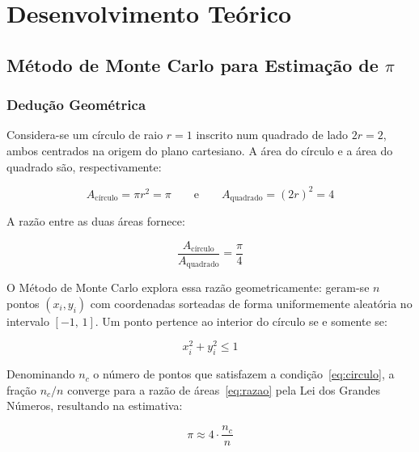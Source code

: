\documentclass[12pt, a4paper]{article}
\begin{document}
	\section{Desenvolvimento Teórico}
	
	\subsection{Método de Monte Carlo para Estimação de $\pi$}
	
	\subsubsection{Dedução Geométrica}
	
	Considera-se um círculo de raio $r = 1$ inscrito num quadrado de lado $2r = 2$,
	ambos centrados na origem do plano cartesiano. A área do círculo e a área do
	quadrado são, respectivamente:
	
	\begin{equation}
		A_{\text{círculo}} = \pi r^2 = \pi
		\qquad \text{e} \qquad
		A_{\text{quadrado}} = (2r)^2 = 4
		\label{eq:areas}
	\end{equation}
	
	A razão entre as duas áreas fornece:
	
	\begin{equation}
		\frac{A_{\text{círculo}}}{A_{\text{quadrado}}} = \frac{\pi}{4}
		\label{eq:razao}
	\end{equation}
	
	O Método de Monte Carlo explora essa razão geometricamente: geram-se $n$ pontos
	$(x_i, y_i)$ com coordenadas sorteadas de forma uniformemente aleatória no
	intervalo $[-1,\,1]$. Um ponto pertence ao interior do círculo se e somente se:
	
	\begin{equation}
		x_i^2 + y_i^2 \leq 1
		\label{eq:circulo}
	\end{equation}
	
	Denominando $n_c$ o número de pontos que satisfazem a condição~\eqref{eq:circulo},
	a fração $n_c/n$ converge para a razão de áreas~\eqref{eq:razao} pela Lei dos
	Grandes Números, resultando na estimativa:
	
	\begin{equation}
		\boxed{\pi \approx 4 \cdot \frac{n_c}{n}}
		\label{eq:montecarlo}
	\end{equation}
	
\end{document}
